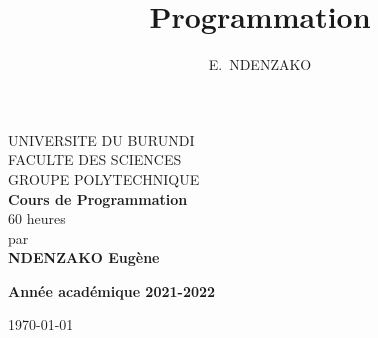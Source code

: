\documentclass[a4paper, oneside,11pt]{book}
\author{E.~NDENZAKO}
\title{Programmation}
\begin{document}
\begin{titlepage}


\begin{center}



\thisfancypage{%
\setlength{\fboxsep}{16pt}\doublebox}{}


  \thispagestyle{empty}

\vspace{3 cm}
{\Large UNIVERSITE DU BURUNDI}\\[0.35cm]
{\large FACULTE DES SCIENCES}\\[0.35cm]
{\large GROUPE POLYTECHNIQUE}\\[0.35cm]
\vspace*{1.5cm}
{\LARGE \textbf{Cours de Programmation}}\\[0.25cm] 
{\Large 60 heures}\\[0.5cm]
par\\[0.5cm]
\textbf{NDENZAKO Eug\`ene}

\vspace*{1.25cm}

\vspace*{3.0cm}
{\large \textbf{Ann\'ee acad\'emique 2021-2022}}


  \today
  \vspace{\fill}
\end{center}
\end{titlepage}








\frontmatter
{}
\tableofcontents

\pagestyle{fancy}
\fancyhf{}

\end{document}
